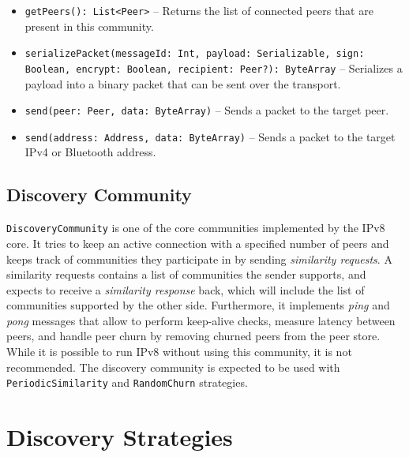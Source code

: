 \begin{itemize}
    \item \texttt{getPeers(): List<Peer>} – Returns the list of connected peers that are present in this community.
    \item \texttt{serializePacket(messageId: Int, payload: Serializable, sign: Boolean, encrypt: Boolean, recipient: Peer?): ByteArray} – Serializes a payload into a binary packet that can be sent over the transport.
    \item \texttt{send(peer: Peer, data: ByteArray)} – Sends a packet to the target peer.
    \item \texttt{send(address: Address, data: ByteArray)} – Sends a packet to the target IPv4 or Bluetooth address.
\end{itemize}

\subsection{Discovery Community}

\texttt{DiscoveryCommunity} is one of the core communities implemented by the IPv8 core. It tries to keep an active connection with a specified number of peers and keeps track of communities they participate in by sending \textit{similarity requests}. A similarity requests contains a list of communities the sender supports, and expects to receive a \textit{similarity response} back, which will include the list of communities supported by the other side. Furthermore, it implements \textit{ping} and \textit{pong} messages that allow to perform keep-alive checks, measure latency between peers, and handle peer churn by removing churned peers from the peer store. While it is possible to run IPv8 without using this community, it is not recommended. The discovery community is expected to be used with \texttt{PeriodicSimilarity} and \texttt{RandomChurn} strategies.





\section{Discovery Strategies}

